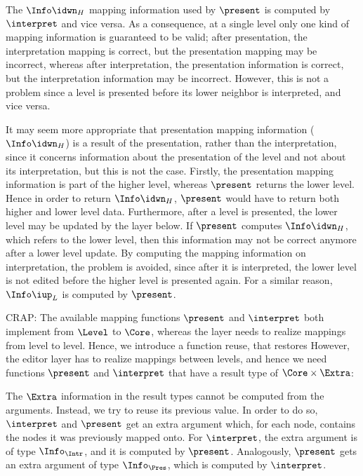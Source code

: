 The $\Info\idwn_{H}$ mapping information used by $\present$ is computed by $\interpret$ and vice versa. As a consequence, at a single level only one kind of mapping information is guaranteed to be valid; after presentation, the interpretation mapping is correct, but the presentation mapping may be incorrect, whereas after interpretation, the presentation information is correct, but the interpretation information may be incorrect. However, this is not a problem since a level is presented before its lower neighbor is interpreted, and vice versa. 

It may seem more appropriate that presentation mapping information ($\Info\idwn_{H}$) is a result of the presentation, rather than the interpretation, since it concerns information about the presentation of the level and not about its interpretation, but this is not the case. Firstly, the presentation mapping information is part of the higher level, whereas $\present$ returns the lower level. Hence in order to return $\Info\idwn_{H}$, $\present$ would have to return both higher and lower level data.  Furthermore, after a level is presented, the lower level may be updated by the layer below. If $\present$ computes $\Info\idwn_{H}$, which refers to the lower level, then this information may not be correct anymore after a lower level update. By computing the mapping information on interpretation, the problem is avoided, since after it is interpreted, the lower level is not edited before the higher level is presented again. For a similar reason, $\Info\iup_{L}$ is computed by $\present$.



\bc CRAP:
The available mapping functions $\present$ and $\interpret$ both implement from $\Level$ to $\Core$, whereas the layer needs to realize mappings from level to level. Hence, we introduce a function reuse, that restores However, the editor layer has to realize mappings between levels, and hence we need functions $\present$ and $\interpret$ that have a result type of $\Core \times \Extra$:

The $\Extra$ information in the result types cannot be computed from the arguments. Instead, we try to reuse its previous value. In order to do so, $\interpret$ and $\present$ get an extra argument which, for each node, contains the nodes it was previously mapped onto. For $\interpret$, the extra argument is of type $\Info_{\Intr}$, and it is computed by $\present$. Analogously, $\present$ gets an extra argument of type $\Info_{\Pres}$, which is computed by $\interpret$. 
\ec

